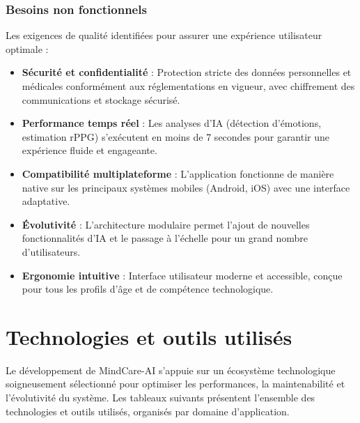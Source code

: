 \subsubsection{Besoins non fonctionnels}
Les exigences de qualité identifiées pour assurer une expérience utilisateur optimale :
\begin{itemize}
    \item \textbf{Sécurité et confidentialité} : Protection stricte des données personnelles et médicales conformément aux réglementations en vigueur, avec chiffrement des communications et stockage sécurisé.
    \item \textbf{Performance temps réel} : Les analyses d'IA (détection d'émotions, estimation rPPG) s'exécutent en moins de 7 secondes pour garantir une expérience fluide et engageante.
    \item \textbf{Compatibilité multiplateforme} : L'application fonctionne de manière native sur les principaux systèmes mobiles (Android, iOS) avec une interface adaptative.
    \item \textbf{Évolutivité} : L'architecture modulaire permet l'ajout de nouvelles fonctionnalités d'IA et le passage à l'échelle pour un grand nombre d'utilisateurs.
    \item \textbf{Ergonomie intuitive} : Interface utilisateur moderne et accessible, conçue pour tous les profils d'âge et de compétence technologique.
\end{itemize}

\section{Technologies et outils utilisés}
Le développement de MindCare-AI s'appuie sur un écosystème technologique soigneusement sélectionné pour optimiser les performances, la maintenabilité et l'évolutivité du système. Les tableaux suivants présentent l'ensemble des technologies et outils utilisés, organisés par domaine d'application.

